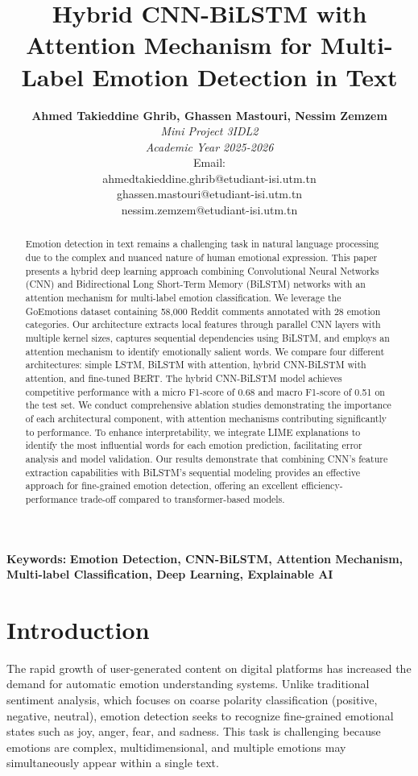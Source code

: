 \documentclass[12pt,a4paper]{article}
\title{\textbf{Hybrid CNN-BiLSTM with Attention Mechanism for Multi-Label Emotion Detection in Text}}
\author{
\textbf{Ahmed Takieddine Ghrib, Ghassen Mastouri, Nessim Zemzem} \\
\textit{Mini Project 3IDL2} \\
\textit{Academic Year 2025-2026} \\
Email: \\
    {ahmedtakieddine.ghrib@etudiant-isi.utm.tn} \\
    {ghassen.mastouri@etudiant-isi.utm.tn} \\
    {nessim.zemzem@etudiant-isi.utm.tn}
}
\date{}
\begin{document}
\maketitle
\thispagestyle{empty}

\begin{abstract}
\noindent
Emotion detection in text remains a challenging task in natural language processing due to the complex and nuanced nature of human emotional expression. This paper presents a hybrid deep learning approach combining Convolutional Neural Networks (CNN) and Bidirectional Long Short-Term Memory (BiLSTM) networks with an attention mechanism for multi-label emotion classification. We leverage the GoEmotions dataset containing 58,000 Reddit comments annotated with 28 emotion categories. Our architecture extracts local features through parallel CNN layers with multiple kernel sizes, captures sequential dependencies using BiLSTM, and employs an attention mechanism to identify emotionally salient words. We compare four different architectures: simple LSTM, BiLSTM with attention, hybrid CNN-BiLSTM with attention, and fine-tuned BERT. The hybrid CNN-BiLSTM model achieves competitive performance with a micro F1-score of 0.68 and macro F1-score of 0.51 on the test set. We conduct comprehensive ablation studies demonstrating the importance of each architectural component, with attention mechanisms contributing significantly to performance. To enhance interpretability, we integrate LIME explanations to identify the most influential words for each emotion prediction, facilitating error analysis and model validation. Our results demonstrate that combining CNN's feature extraction capabilities with BiLSTM's sequential modeling provides an effective approach for fine-grained emotion detection, offering an excellent efficiency-performance trade-off compared to transformer-based models.
\end{abstract}

\noindent
\textbf{Keywords:} \textbf{Emotion Detection, CNN-BiLSTM, Attention Mechanism, Multi-label Classification, Deep Learning, Explainable AI}

\vspace{0.5cm}

\section{Introduction}
\justifying

The rapid growth of user-generated content on digital platforms has increased the demand for automatic emotion understanding systems. Unlike traditional sentiment analysis, which focuses on coarse polarity classification (positive, negative, neutral), emotion detection seeks to recognize fine-grained emotional states such as joy, anger, fear, and sadness. This task is challenging because emotions are complex, multidimensional, and multiple emotions may simultaneously appear within a single text.
\end{document}
